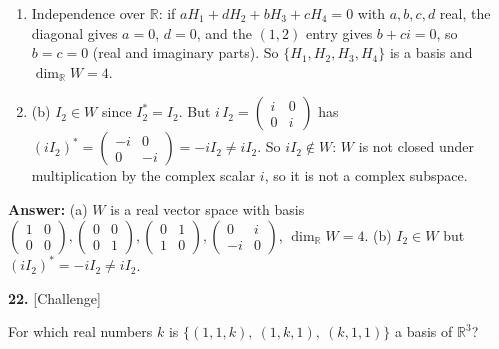 \documentclass[11pt]{article}
\begin{document}
\begin{tcolorbox}[breakable,colback=ans,colframe=ansb,boxrule=0.5pt,left=4pt,right=4pt,top=2pt,bottom=2pt]
\begin{enumerate}[leftmargin=3.1em,itemsep=1pt,topsep=1pt,label=\textbf{Step \arabic*.}]
\item Independence over $\mathbb{R}$: if $aH_1+dH_2+bH_3+cH_4=0$ with $a,b,c,d$ real, the diagonal gives $a=0$, $d=0$, and the $(1,2)$ entry gives $b+ci=0$, so $b=c=0$ (real and imaginary parts). So $\{H_1,H_2,H_3,H_4\}$ is a basis and $\dim_{\mathbb{R}}W=4$.
\item (b) $I_2\in W$ since $I_2^{*}=I_2$. But $i\,I_2=\begin{pmatrix}i&0\\0&i\end{pmatrix}$ has $(iI_2)^{*}=\begin{pmatrix}-i&0\\0&-i\end{pmatrix}=-iI_2\neq iI_2$. So $iI_2\notin W$: $W$ is not closed under multiplication by the complex scalar $i$, so it is not a complex subspace.
\end{enumerate}\textbf{Answer:} (a) $W$ is a real vector space with basis $\begin{pmatrix}1&0\\0&0\end{pmatrix},\begin{pmatrix}0&0\\0&1\end{pmatrix},\begin{pmatrix}0&1\\1&0\end{pmatrix},\begin{pmatrix}0&i\\-i&0\end{pmatrix}$, $\dim_{\mathbb{R}}W=4$. (b) $I_2\in W$ but $(iI_2)^{*}=-iI_2\neq iI_2$.\end{tcolorbox}
\par\vspace{2pt}
\begin{minipage}{\linewidth}\textbf{22.} \hfill{\scriptsize\color{ink}[Challenge]}\par\nopagebreak For which real numbers $k$ is $\{(1,1,k),\ (1,k,1),\ (k,1,1)\}$ a basis of $\mathbb{R}^{3}$?
\end{minipage}\par\nopagebreak
\end{document}
